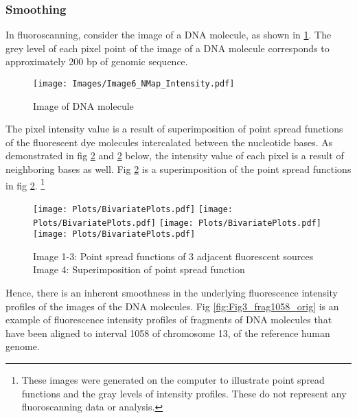 \subsubsection*{Smoothing} \label{ch3_smooth}
In fluoroscanning, consider the image of a DNA molecule, as shown in \ref{fig:Fig3_NMap_Intensity}. The grey level of each pixel point of the image of a DNA molecule corresponds to approximately 200 bp of genomic sequence. 
\begin{figure}[H]
\begin{center}
\texttt{[image: Images/Image6\_NMap\_Intensity.pdf]}
\end{center}
\caption{Image of DNA molecule \cite{Kounovsky_etal_2013_Macromolecules}}
\label{fig:Fig3_NMap_Intensity}
\end{figure}
The pixel intensity value is a result of superimposition of point spread functions of the fluorescent dye molecules intercalated between the nucleotide bases. As demonstrated in fig \ref{fig:Fig3_Bivariate} and \ref{fig:Fig3_Bivariate} below, the intensity value of each pixel is a result of neighboring bases as well. Fig \ref{fig:Fig3_Bivariate} is a superimposition of the point spread functions in fig \ref{fig:Fig3_Bivariate}. \footnote{These images were generated on the computer to illustrate point spread functions and the gray levels of intensity profiles. These do not represent any fluoroscanning data or analysis.}  
\begin{figure}[H]
\begin{center}
\texttt{[image: Plots/BivariatePlots.pdf]}
\texttt{[image: Plots/BivariatePlots.pdf]}
\texttt{[image: Plots/BivariatePlots.pdf]} \\
\texttt{[image: Plots/BivariatePlots.pdf]}
\end{center}
\caption{Image 1-3: Point spread functions of 3 adjacent fluorescent sources \\ Image 4: Superimposition of point spread function} 
\label{fig:Fig3_Bivariate}
\end{figure}

Hence, there is an inherent smoothness in the underlying fluorescence intensity profiles of the images of the DNA molecules. Fig \ref{fig:Fig3_frag1058_orig} is an example of fluorescence intensity profiles of fragments of DNA molecules that have been aligned to interval 1058 of chromosome 13, of the reference human genome. 

